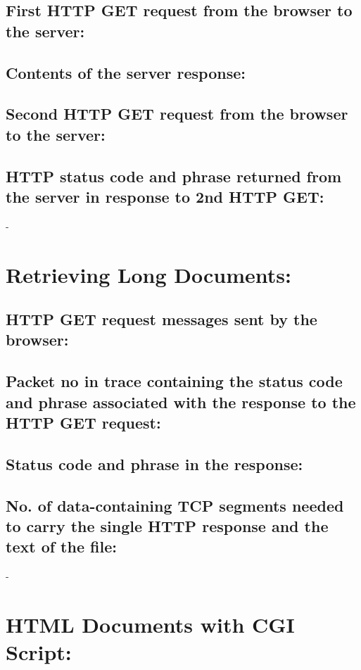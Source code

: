 \documentclass[]{report}
\begin{document}
\subsection{First HTTP GET request from the browser to the server:}

\subsection{Contents of the server response:}

\subsection{Second HTTP GET request from the browser to the server: }

\subsection{HTTP status code and phrase returned from the server in response to 2nd HTTP GET:}
-


\section{Retrieving Long Documents:}
\subsection{HTTP GET request messages sent by the browser:}

\subsection{Packet no in trace containing the status code and phrase associated with the response to the HTTP GET request:}

\subsection{Status code and phrase in the response:}

\subsection{No. of data-containing TCP segments needed to carry the single HTTP response and the text of the file:}
-


\section{HTML Documents with CGI Script:}
\end{document}
